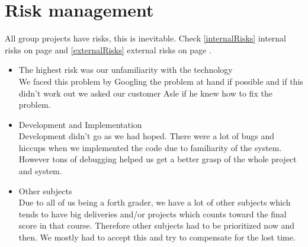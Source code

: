 \section{Risk management}
All group projects have risks, this is inevitable. Check \ref{internalRisks} internal risks on page \pageref{internalRisks} and \ref{externalRisks} external risks on page \pageref{externalRisks}.

\begin{itemize}
	\item The highest risk was our unfamiliarity with the technology \\ We faced this problem by Googling the problem at hand if possible and if this didn't work out we asked our customer Asle if he knew how to fix the problem.
	\item Development and Implementation \\ Development didn't go as we had hoped. There were a lot of bugs and hiccups when we implemented the code due to familiarity of the system. However tons of debugging helped us get a better grasp of the whole project and system.
	\item Other subjects \\Due to all of us being a forth grader, we have a lot of other subjects which tends to have big deliveries and/or projects which counts toward the final score in that course. Therefore other subjects had to be prioritized now and then. We mostly had to accept this and try to compensate for the lost time.


\end{itemize}
